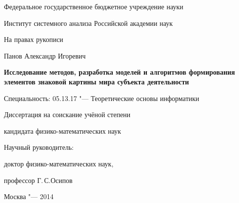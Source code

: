 \thispagestyle{empty}

\begin{center}
Федеральное государственное бюджетное учреждение науки\par
Институт системного анализа Российской академии наук\par 
\par
\end{center}

\vspace{10mm}
\begin{flushright}
На правах рукописи
\end{flushright}

\vspace{15mm}
\begin{center}
{\large Панов Александр Игоревич}
\end{center}

\vspace{5mm}
\begin{center}
{\bfseries\Large Исследование методов, разработка моделей и алгоритмов формирования элементов знаковой картины мира субъекта деятельности
\par}

\vspace{10mm}
{%
Специальность: 05.13.17 "--- Теоретические основы информатики
}

\vspace{5mm}
Диссертация на соискание учёной степени

кандидата физико-математических наук
\end{center}

\vspace{30mm}
\begin{flushright}
Научный руководитель:

доктор физико-математических наук,

профессор Г.\,С.\;Осипов

\end{flushright}

\vspace{20mm}
\begin{center}
{Москва "--- 2014}
\end{center}

\newpage